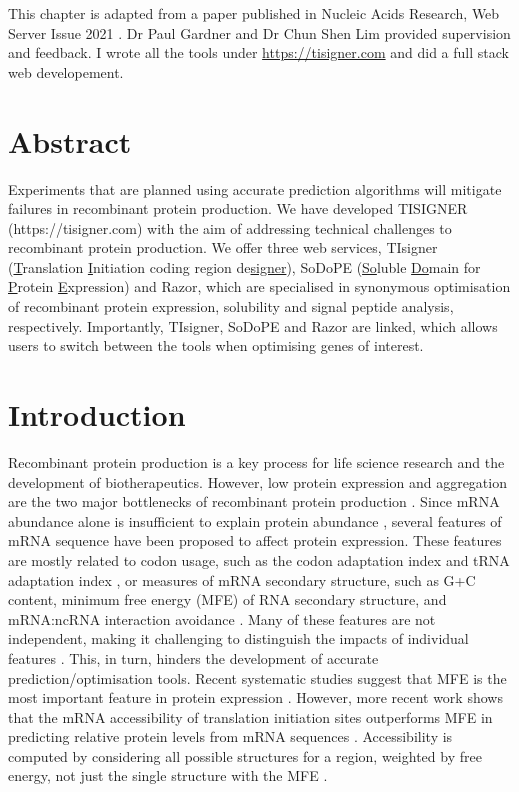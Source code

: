 This chapter is adapted from a paper published in Nucleic Acids Research, Web Server Issue 2021 \cite{bhandaribk2021-nar-gkab175}. Dr Paul Gardner and Dr Chun Shen Lim provided supervision and feedback. I wrote all the tools under \href{https://tisigner.com}{https://tisigner.com} and did a full stack web developement.


\section{Abstract}
Experiments that are planned using accurate prediction algorithms will
mitigate failures in recombinant protein production. We have developed
TISIGNER \\(https://tisigner.com) with the aim of addressing technical
challenges to recombinant protein production. We offer three web
services, TIsigner (\underline{T}ranslation \underline{I}nitiation
coding region de\underline{signer}), SoDoPE (\underline{So}luble
\underline{Do}main for \underline{P}rotein \underline{E}xpression) and
Razor, which are specialised in synonymous optimisation of recombinant
protein expression, solubility and signal peptide analysis,
respectively. Importantly, TIsigner, SoDoPE and Razor are linked, which
allows users to switch between the tools when optimising genes of
interest.


\section{Introduction}

Recombinant protein production is a key process for life science
research and the development of biotherapeutics. However, low protein
expression and aggregation are the two major bottlenecks of recombinant
protein production \cite{Berlec2013-mb,Esposito2006-tj,Hou2018-yd,Kramer2012-wk,Mazurenko2020-pr,Rosano2014-oq,Vihinen2020-ar}.
Since mRNA abundance alone is insufficient to explain protein abundance \cite{Bernstein2002-gg,Abreu2009-zf,Lim2018-rq,Nieuwkoop2020-ph,Taniguchi2010-uq},
several features of mRNA sequence have been proposed to affect protein expression. 
These features are mostly related to codon usage, such as
the codon adaptation index and tRNA adaptation index
\cite{Brule2017-mx,Reis2004-dl,Gutman1989-pn,Sabi2014-je,Sharp1987-ed},
or measures of mRNA secondary structure, such as G+C content, minimum
free energy (MFE) of RNA secondary structure, and mRNA:ncRNA interaction
avoidance
\cite{De_Smit1990-xy,Dvir2013-lq,Kudla2009-tl,Plotkin2011-ak,Tuller2015-ts,Umu2016-zq}.
Many of these features are not independent, making it challenging to
distinguish the impacts of individual features
\cite{mauger2019mrna}. This, in turn, hinders
the development of accurate prediction/optimisation tools. Recent systematic 
studies suggest that MFE is the most important feature in
protein expression \cite{Cambray2018-kn,mauger2019mrna}. However, more 
recent work shows that the mRNA accessibility of translation initiation sites 
outperforms MFE in predicting relative protein levels from mRNA sequences
\cite{bhandari2019highly,Terai2020-co}. Accessibility
is computed by considering all possible structures for a region,
weighted by free energy, not just the single structure with the MFE \cite{Bernhart2006-ma}.

